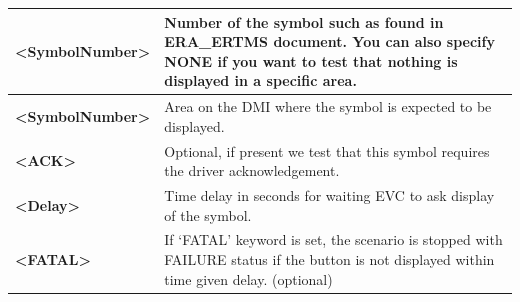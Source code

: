 \begin{itemize}
\begin{longtable}{|l|l|}
				\hline

					\begin{minipage}[t]{0.22\linewidth} \textbf{<SymbolNumber>}	\end{minipage}
				&	\begin{minipage}[t]{0.78\linewidth} Number of the symbol such as found in ERA\_ERTMS document. You can also specify NONE if you want to test that nothing is displayed in a specific area. \end{minipage} \\ \hline

					\begin{minipage}[t]{0.22\linewidth} \textbf{<SymbolNumber>} \end{minipage}
				&	\begin{minipage}[t]{0.78\linewidth} Area on the DMI where the symbol is expected to be displayed.\end{minipage} \\

				\hline

					\begin{minipage}[t]{0.22\linewidth} \textbf{<ACK>} \end{minipage}
				&	\begin{minipage}[t]{0.78\linewidth} Optional, if present we test that this symbol requires the driver acknowledgement. \end{minipage} \\

				\hline

					\begin{minipage}[t]{0.22\linewidth} \textbf{<Delay>} \end{minipage}
				&	\begin{minipage}[t]{0.78\linewidth} Time delay in seconds for waiting EVC to ask display of the symbol. \end{minipage} \\

				\hline

					\begin{minipage}[t]{0.22\linewidth} \textbf{<FATAL>} \end{minipage}
				&	\begin{minipage}[t]{0.78\linewidth} If ‘FATAL’ keyword is set, the scenario is stopped with FAILURE status if the button is not displayed within time given delay. (optional) \end{minipage} \\

				\hline


\end{longtable}
\end{itemize}
